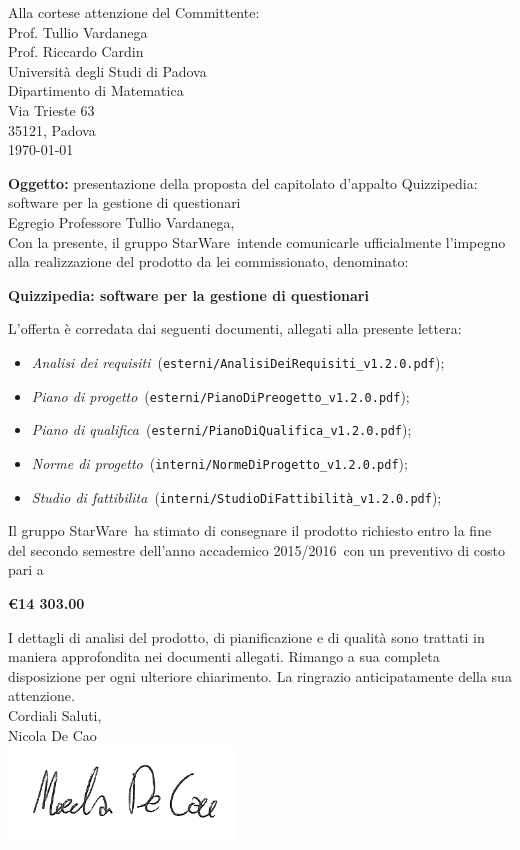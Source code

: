 \documentclass[12pt,a4paper]{article}
\title{\titoloDocumento}
\newcommand{\nomeGruppo}{StarWare}
\newcommand{\uni}{Universit\`{a} degli Studi di Padova}
\newcommand{\uniAA}{2015/2016}
\newcommand{\Cardin}{Prof. Riccardo Cardin}
\newcommand{\Vardanega}{Prof. Tullio Vardanega}
\newcommand{\prjL}{Quizzipedia: software per la gestione di questionari}
\newcommand{\NDC}{Nicola De Cao}
\newcommand{\NdP}{\emph{Norme di progetto}}
\newcommand{\SdF}{\emph{Studio di fattibilita}}
\newcommand{\AdR}{\emph{Analisi dei requisiti}}
\newcommand{\PdP}{\emph{Piano di progetto}}
\newcommand{\PdQ}{\emph{Piano di qualifica}}
\newcommand{\filePath}[1]{\texttt{#1}}
\begin{document}
\hspace{8cm}\begin{minipage}[t]{10cm}
	Alla cortese attenzione del Committente: \\
	\Vardanega \\
	\Cardin \\
	\uni \\
	Dipartimento di Matematica\\
	Via Trieste 63\\
	35121, Padova\\
	\today \\
\end{minipage}
\vspace{1cm}

\textbf{Oggetto: } presentazione della proposta del capitolato d'appalto \prjL\\

Egregio Professore Tullio Vardanega,\\
Con la presente, il gruppo \nomeGruppo\ intende comunicarle ufficialmente l’impegno alla realizzazione del prodotto da lei commissionato, denominato:
\begin{center}
	\textbf{\prjL}
\end{center}
L’offerta è corredata dai seguenti documenti, allegati alla presente lettera:

\begin{itemize}
	\item \AdR\ (\filePath{esterni/AnalisiDeiRequisiti\_v1.2.0.pdf});
	\item \PdP\ (\filePath{esterni/PianoDiPreogetto\_v1.2.0.pdf});
	\item \PdQ\ (\filePath{esterni/PianoDiQualifica\_v1.2.0.pdf});
	\item \NdP\ (\filePath{interni/NormeDiProgetto\_v1.2.0.pdf});
	\item \SdF\ (\filePath{interni/StudioDiFattibilità\_v1.2.0.pdf});
\end{itemize}

Il gruppo \nomeGruppo\ ha stimato di consegnare il prodotto richiesto entro la fine del secondo semestre dell'anno accademico \uniAA\ con un preventivo di costo pari a 
\begin{center}
	\textbf{\euro 14 303.00}
\end{center}

I dettagli di analisi del prodotto, di pianificazione e di qualità sono trattati in maniera approfondita nei documenti allegati. Rimango a sua completa disposizione per ogni ulteriore chiarimento. La ringrazio anticipatamente della sua attenzione.\\

Cordiali Saluti,\\
\NDC \\
\includegraphics[width=6cm]{firmaDeCao.png}
\end{document}
